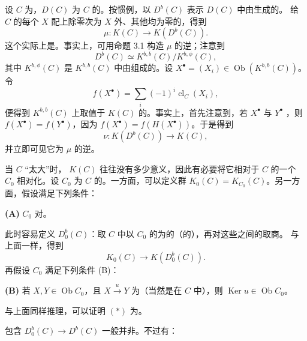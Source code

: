 设 $C$ 为，$D(C)$ 为 $C$ 的。按惯例，以 $D^b(C)$ 表示 $D(C)$ 中由生成的。
给 $C$ 的每个 $X$ 配上除零次为 $X$ 外、其他均为零的，得到
\[
\mu:K(C)\longrightarrow K(D^b(C)).
\]
这个实际上是。事实上，可用命题 3.1 构造 $\mu$ 的逆；注意到
\[
D^b(C)\simeq K^{b,b}(C)/K^{b,\phi}(C),
\]
其中 $K^{b,\phi}(C)$ 是 $K^{b,b}(C)$ 中由组成的。设 $X^\bullet=(X_i)\in\operatorname{Ob}(K^{b,b}(C))$。令
\[
f(X^\bullet)=\sum_i(-1)^i\operatorname{cl}_C(X_i),
\]
便得到 $K^{b,b}(C)$ 上取值于 $K(C)$ 的。事实上，首先注意到，若 $X^\bullet$ 与 $Y^\bullet$ ，则 $f(X^\bullet)=f(Y^\bullet)$，因为 $f(X^\bullet)=f(H(X^\bullet))$。于是得到
\[
\nu:K(D^b(C))\longrightarrow K(C),
\]
并立即可见它为 $\mu$ 的逆。

当 $C$ “太大”时， $K(C)$ 往往没有多少意义，因此有必要将它相对于 $C$ 的一个 $C_0$ 相对化。设 $C_0$ 为 $C$ 的。一方面，可以定义群 $K_0(C)=K_{C_0}(C)$。另一方面，假设满足下列条件：

\textbf{(A)} $C_0$ 对。

此时容易定义 $D_0^b(C)$：取 $C$ 中以 $C_0$ 的为的（的），再对这些之间的取商。
与上面一样，得到
\[
K_0(C)\longrightarrow K(D_0^b(C)).\tag{$*$}
\]
再假设 $C_0$ 满足下列条件 (B)：

\textbf{(B)} 若 $X,Y\in\operatorname{Ob}C_0$，且 $X\xrightarrow{u}Y$ 为（当然是在 $C$ 中），则 $\operatorname{Ker}u\in\operatorname{Ob}C_0$。

与上面同样推理，可以证明 $(*)$ 为。

包含 $D_0^b(C)\to D^b(C)$ 一般并非。不过有：

